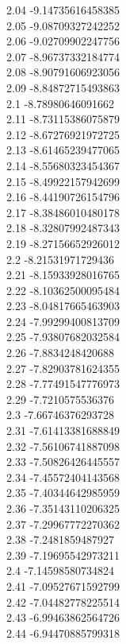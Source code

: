 {2.04	-9.14735616458385\\
2.05	-9.08709327242252\\
2.06	-9.02709902247756\\
2.07	-8.96737332184774\\
2.08	-8.90791606923056\\
2.09	-8.84872715493863\\
2.1	-8.78980646091662\\
2.11	-8.73115386075879\\
2.12	-8.67276921972725\\
2.13	-8.61465239477065\\
2.14	-8.55680323454367\\
2.15	-8.49922157942699\\
2.16	-8.44190726154796\\
2.17	-8.38486010480178\\
2.18	-8.32807992487343\\
2.19	-8.27156652926012\\
2.2	-8.21531971729436\\
2.21	-8.15933928016765\\
2.22	-8.10362500095484\\
2.23	-8.04817665463903\\
2.24	-7.99299400813709\\
2.25	-7.93807682032584\\
2.26	-7.8834248420688\\
2.27	-7.82903781624355\\
2.28	-7.77491547776973\\
2.29	-7.7210575536376\\
2.3	-7.66746376293728\\
2.31	-7.61413381688849\\
2.32	-7.56106741887098\\
2.33	-7.50826426445557\\
2.34	-7.45572404143568\\
2.35	-7.40344642985959\\
2.36	-7.35143110206325\\
2.37	-7.29967772270362\\
2.38	-7.2481859487927\\
2.39	-7.19695542973211\\
2.4	-7.14598580734824\\
2.41	-7.09527671592799\\
2.42	-7.04482778225514\\
2.43	-6.99463862564726\\
2.44	-6.94470885799318\\
}

